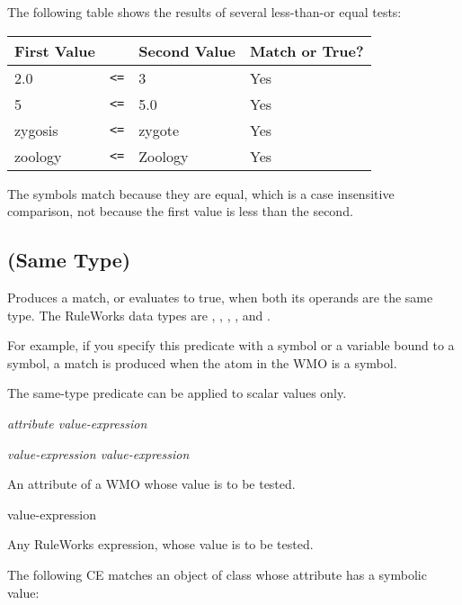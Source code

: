 \Example

The following table shows the results of several less-than-or equal
tests:

\begin{center}
\begin{tabular}{lcll}
  \toprule
  First Value &   & Second Value & Match or True? \\
  \midrule
  2.0         & \verb|<=| & 3            & Yes \\
  5           & \verb|<=| & 5.0          & Yes \\
  zygosis     & \verb|<=| & zygote       & Yes \\
  zoology     & \verb|<=| & Zoology      & Yes \\
  \bottomrule
\end{tabular}
\end{center}

The symbols match because they are equal, which is a case insensitive
comparison, not because the first value is less than the second.

\subsection{\co{<=>} (Same Type)}

Produces a match, or evaluates to true, when both its operands are the
same type. The RuleWorks data types are , ,
, , and .

For example, if you specify this predicate with a symbol or a variable
bound to a symbol, a match is produced when the atom in the WMO is a
symbol.

The same-type predicate can be applied to scalar values only.

\Format

\ct\it{attribute} \co{<=>} \it{value-expression}

\it{value-expression} \co{<=>} \it{value-expression}

An attribute of a WMO whose value is to be tested.

\begin{arguments}
\item[value-expression]
  
  Any RuleWorks expression, whose value is to be tested.
\end{arguments}

\Example

The following CE matches an object of class  whose
\ct{} attribute has a symbolic value:

